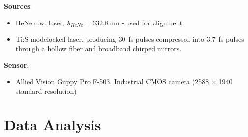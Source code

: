 \documentclass[11pt]{beamer}
\begin{document}
\begin{frame}
\textbf{Sources}:\\
\begin{itemize}
	\item HeNe c.w. laser, $\lambda_{HeNe} = \SI{632.8}{\nm}$ - used for alignment
	\item Ti:S modelocked laser, producing \SI{30}{\fs} pulses compressed into \SI{3.7}{\fs} pulses through a hollow fiber and broadband chirped mirrors.
\end{itemize}
	
\textbf{Sensor}:\\
\begin{itemize}
	\item Allied Vision Guppy Pro F-503, Industrial CMOS camera (2588 $\times$ 1940 standard resolution)
\end{itemize}

\end{frame}

\section{Data Analysis}
\end{document}
